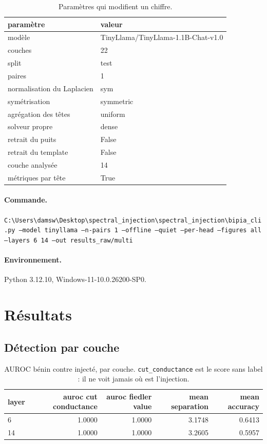\documentclass[11pt,a4paper]{article}
\begin{document}
\begin{table}[htbp]\centering\small
\begin{tabular}{ll}
\hline
paramètre & valeur \\
\hline
modèle & TinyLlama/TinyLlama-1.1B-Chat-v1.0 \\
couches & 22 \\
split & test \\
paires & 1 \\
normalisation du Laplacien & sym \\
symétrisation & symmetric \\
agrégation des têtes & uniform \\
solveur propre & dense \\
retrait du puits & False \\
retrait du template & False \\
couche analysée & 14 \\
métriques par tête & True \\
\hline
\end{tabular}
\caption{Paramètres qui modifient un chiffre.}
\label{tab:config}
\end{table}


\paragraph{Commande.}
\texttt{C:\textbackslash{}Users\textbackslash{}damsw\textbackslash{}Desktop\textbackslash{}spectral\_injection\textbackslash{}spectral\_injection\textbackslash{}bipia\_cli.py --model tinyllama --n-pairs 1 --offline --quiet --per-head --figures all --layers 6 14 --out results\_raw/multi}

\paragraph{Environnement.}
Python 3.12.10, Windows-11-10.0.26200-SP0.


\section{Résultats}

\subsection{Détection par couche}

\begin{table}[htbp]
\centering
\small
\begin{tabular}{lrrrr}
\hline
layer & auroc cut conductance & auroc fiedler value & mean separation & mean accuracy \\
\hline
6 & 1.0000 & 1.0000 & 3.1748 & 0.6413 \\
14 & 1.0000 & 1.0000 & 3.2605 & 0.5957 \\
\hline
\end{tabular}
\caption{AUROC bénin contre injecté, par couche. \texttt{cut\_conductance} est le score sans label : il ne voit jamais où est l'injection.}
\label{tab:layers}
\end{table}
\end{document}
